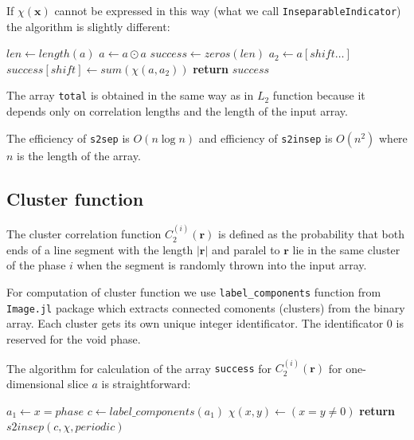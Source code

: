 \documentclass[reprint,amsmath,amssymb,aps,pre,nofootinbib]{revtex4-1}
\newcommand{\code}[1]{\colorbox{light-gray}{\texttt{#1}}}
\begin{document}
If $\chi(\bm{x})$ cannot be expressed in this way (what we call
\code{InseparableIndicator}) the algorithm is slightly different:
\begin{algorithmic}[1]
    \State $len \gets length(a)$
      \State $a \gets a \odot a$
    \EndIf
    \State $success \gets zeros(len)$
      \State $a_2 \gets a[shift \dots]$
      \State $success[shift] \gets sum(\chi(a, a_2))$
    \EndFor
    \State \textbf{return} $success$
  \EndProcedure
\end{algorithmic}

The array \code{total} is obtained in the same way as in $L_2$ function because
it depends only on correlation lengths and the length of the input array.

The efficiency of \code{s2sep} is $O(n\log n)$ and efficiency of
\code{s2insep} is $O(n^2)$ where $n$ is the length of the array.

\subsection{Cluster function}
The cluster correlation function $C_2^{(i)}(\bm{r})$ is defined as the
probability that both ends of a line segment with the length $|\bm{r}|$ and
paralel to $\bm{r}$ lie in the same cluster of the phase $i$ when the segment is
randomly thrown into the input array.

For computation of cluster function we use \code{label\_components} function
from \code{Image.jl} package which extracts connected comonents (clusters) from the
binary array. Each cluster gets its own unique integer identificator. The
identificator $0$ is reserved for the void phase.

The algorithm for calculation of the array \code{success} for
$C_2^{(i)}(\bm{r})$ for one-dimensional slice $a$ is straightforward:
\begin{algorithmic}[1]
  \State $a_1 \gets x = phase$ 
  \State $c \gets label\_components(a_1)$
  \State $\chi(x,y) \gets (x = y \ne 0)$
  \State \textbf{return} $s2insep(c, \chi, periodic)$
  \EndProcedure
\end{algorithmic}
\end{document}
